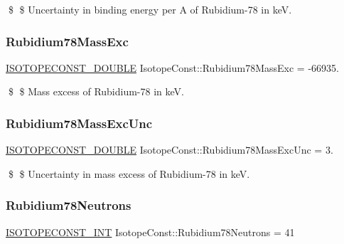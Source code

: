 \$ \$ Uncertainty in binding energy per A of Rubidium-\/78 in keV. \mbox{\label{group___isotope_const-_rubidium-_rb78_ga7f8d7f4d823bfd4e6a9c502d1a0e5bad}} 
\subsubsection{\texorpdfstring{Rubidium78\+Mass\+Exc}{Rubidium78MassExc}}
{\footnotesize\ttfamily \mbox{\hyperlink{group___isotope_const-_macros_ga8f45a7272ce02c0b4c65c44636ed719a}{I\+S\+O\+T\+O\+P\+E\+C\+O\+N\+S\+T\+\_\+\+D\+O\+U\+B\+LE}} Isotope\+Const\+::\+Rubidium78\+Mass\+Exc = -\/66935.}

\$ \$ Mass excess of Rubidium-\/78 in keV. \mbox{\label{group___isotope_const-_rubidium-_rb78_ga4df537eff1e75f47ed877a961d50920a}} 
\subsubsection{\texorpdfstring{Rubidium78\+Mass\+Exc\+Unc}{Rubidium78MassExcUnc}}
{\footnotesize\ttfamily \mbox{\hyperlink{group___isotope_const-_macros_ga8f45a7272ce02c0b4c65c44636ed719a}{I\+S\+O\+T\+O\+P\+E\+C\+O\+N\+S\+T\+\_\+\+D\+O\+U\+B\+LE}} Isotope\+Const\+::\+Rubidium78\+Mass\+Exc\+Unc = 3.}

\$ \$ Uncertainty in mass excess of Rubidium-\/78 in keV. \mbox{\label{group___isotope_const-_rubidium-_rb78_gaa26397df958af5b9b82309b3c0aa3f19}} 
\subsubsection{\texorpdfstring{Rubidium78\+Neutrons}{Rubidium78Neutrons}}
{\footnotesize\ttfamily \mbox{\hyperlink{group___isotope_const-_macros_ga5f18360b3e99483a35c32d789e62621c}{I\+S\+O\+T\+O\+P\+E\+C\+O\+N\+S\+T\+\_\+\+I\+NT}} Isotope\+Const\+::\+Rubidium78\+Neutrons = 41}

